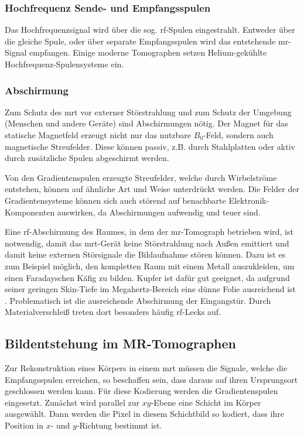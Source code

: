 \subsubsection{Hochfrequenz Sende- und Empfangsspulen}
Das Hochfrequenzsignal wird über die sog. \gls{rf}-Spulen eingestrahlt. Entweder über die gleiche Spule, oder über separate Empfangsspulen wird das entstehende \gls{mr}-Signal empfangen. Einige moderne Tomographen setzen Helium-gekühlte Hochfrequenz-Spulensysteme ein.

\subsubsection{Abschirmung}
Zum Schutz des \gls{mrt} vor externer Störstrahlung und zum Schutz der Umgebung (Menschen und andere Geräte) sind Abschirmungen nötig.
Der Magnet für das statische Magnetfeld erzeugt nicht nur das nutzbare $B_0$-Feld, sondern auch magnetische Streufelder. Diese können passiv, z.B. durch Stahlplatten oder aktiv durch zusätzliche Spulen abgeschirmt werden.

Von den Gradientenspulen erzeugte Streufelder, welche durch Wirbelströme entstehen, können auf ähnliche Art und Weise unterdrückt werden. Die Felder der Gradientensysteme können sich auch störend auf benachbarte Elektronik-Komponenten auswirken, da Abschirmungen aufwendig und teuer sind.

Eine \gls{rf}-Abschirmung des Raumes, in dem der \gls{mr}-Tomograph betrieben wird, ist notwendig, damit das \gls{mrt}-Gerät keine Störstrahlung nach Außen emittiert und damit keine externen Störsignale die Bildaufnahme stören können.
Dazu ist es zum Beispiel möglich, den kompletten Raum mit einem Metall auszukleiden, um einen Faradayschen Käfig zu bilden. Kupfer ist dafür gut geeignet, da aufgrund seiner geringen Skin-Tiefe im Megahertz-Bereich eine dünne Folie ausreichend ist \cite{Weibler1993}. Problematisch ist die ausreichende Abschirmung der Eingangstür. Durch Materialverschleiß treten dort besonders häufig \gls{rf}-Lecks auf.

\subsection{Bildentstehung im MR-Tomographen}
Zur Rekonstruktion eines Körpers in einem \gls{mrt} müssen die Signale, welche die Empfangsspulen erreichen, so beschaffen sein, dass daraus auf ihren Ursprungsort geschlossen werden kann. Für diese Kodierung werden die Gradientenspulen eingesetzt. Zunächst wird parallel zur $xy$-Ebene eine Schicht im Körper ausgewählt. Dann werden die Pixel in diesem Schichtbild so kodiert, dass ihre Position in $x$- und $y$-Richtung bestimmt ist.

